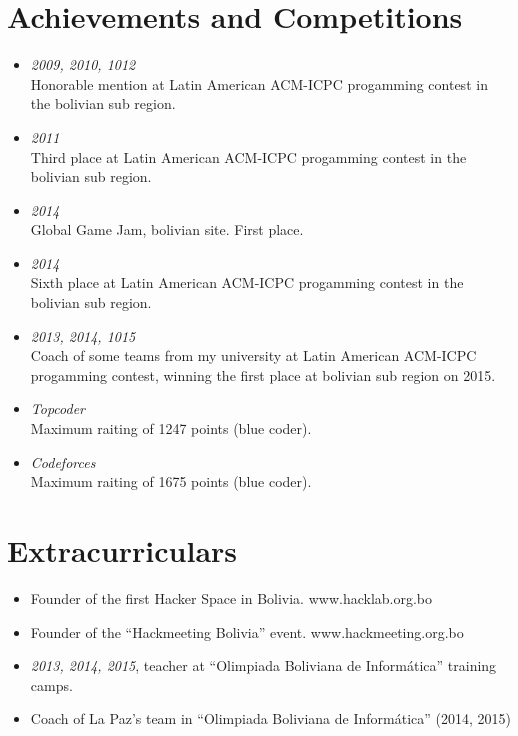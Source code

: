 \documentclass[margin, 10pt]{res} %
\begin{document}
\begin{resume}
\section{Achievements and Competitions}
\begin{itemize}
\item[] {\sl 2009, 2010, 1012} \\
Honorable mention at Latin American ACM-ICPC progamming contest in the bolivian sub region. \\
\item[] {\sl 2011} \\
Third place at Latin American ACM-ICPC progamming contest in the bolivian sub region. \\
\item[] {\sl 2014} \\
Global Game Jam, bolivian site. First place. \\

\item[] {\sl 2014} \\
  Sixth place at Latin American ACM-ICPC progamming contest in the bolivian sub region. \\

\item[] {\sl 2013, 2014, 1015} \\
  Coach of some teams from my university at Latin American ACM-ICPC progamming contest, winning the first place at bolivian sub region on 2015. \\
  
\item[] {\sl Topcoder} \\
Maximum raiting of 1247 points (blue coder). \\
\item[] {\sl Codeforces} \\
Maximum raiting of 1675 points (blue coder). \\
\end{itemize}

\section{Extracurriculars}
\begin{itemize}
\item[] Founder of the first Hacker Space in Bolivia. www.hacklab.org.bo \\
\item[] Founder of the ``Hackmeeting Bolivia'' event. www.hackmeeting.org.bo \\
\item[] {\sl 2013, 2014, 2015}, teacher at ``Olimpiada Boliviana de Inform\'atica'' training camps. \\
\item[] Coach of La Paz's team in ``Olimpiada Boliviana de Inform\'atica'' (2014, 2015)\\
\end{itemize}


\end{resume}
\end{document}

